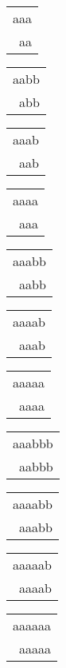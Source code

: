 \begin{description}
\begin{tabular}{|l|}
\hline
\end{tabular} 
\begin{tabular}{|l|} \hline
aaa \\
\ aa \\
\hline
\end{tabular} 
\begin{tabular}{|l|} \hline
aabb \\
\ abb \\
\hline
\end{tabular} 
\begin{tabular}{|l|} \hline
aaab \\
\ aab \\
\hline
\end{tabular} 
\begin{tabular}{|l|} \hline
aaaa \\
\ aaa \\
\hline
\end{tabular} 
\begin{tabular}{|l|} \hline
aaabb \\
\ aabb \\
\hline
\end{tabular} 
\begin{tabular}{|l|} \hline
aaaab \\
\ aaab \\
\hline
\end{tabular} 
\begin{tabular}{|l|} \hline
aaaaa \\
\ aaaa \\
\hline
\end{tabular} 
\begin{tabular}{|l|} \hline
aaabbb \\
\ aabbb \\
\hline
\end{tabular} 
\begin{tabular}{|l|} \hline
aaaabb \\
\ aaabb \\
\hline
\end{tabular} 
\begin{tabular}{|l|} \hline
aaaaab \\
\ aaaab \\
\hline
\end{tabular} 
\begin{tabular}{|l|} \hline
aaaaaa \\
\ aaaaa \\
\hline
\end{tabular} 
\begin{tabular}{|l|} \hline

\end{tabular}
\end{description}
